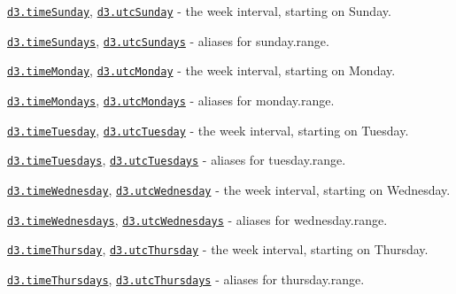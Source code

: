 \begin{DoxyItemize}
\item \href{https://github.com/d3/d3-time/blob/master/README.md#timeSunday}{\tt d3.\+time\+Sunday}, \href{https://github.com/d3/d3-time/blob/master/README.md#timeSunday}{\tt d3.\+utc\+Sunday} -\/ the week interval, starting on Sunday.
\item \href{https://github.com/d3/d3-time/blob/master/README.md#timeSunday}{\tt d3.\+time\+Sundays}, \href{https://github.com/d3/d3-time/blob/master/README.md#timeSunday}{\tt d3.\+utc\+Sundays} -\/ aliases for sunday.\+range.
\item \href{https://github.com/d3/d3-time/blob/master/README.md#timeMonday}{\tt d3.\+time\+Monday}, \href{https://github.com/d3/d3-time/blob/master/README.md#timeMonday}{\tt d3.\+utc\+Monday} -\/ the week interval, starting on Monday.
\item \href{https://github.com/d3/d3-time/blob/master/README.md#timeMonday}{\tt d3.\+time\+Mondays}, \href{https://github.com/d3/d3-time/blob/master/README.md#timeMonday}{\tt d3.\+utc\+Mondays} -\/ aliases for monday.\+range.
\item \href{https://github.com/d3/d3-time/blob/master/README.md#timeTuesday}{\tt d3.\+time\+Tuesday}, \href{https://github.com/d3/d3-time/blob/master/README.md#timeTuesday}{\tt d3.\+utc\+Tuesday} -\/ the week interval, starting on Tuesday.
\item \href{https://github.com/d3/d3-time/blob/master/README.md#timeTuesday}{\tt d3.\+time\+Tuesdays}, \href{https://github.com/d3/d3-time/blob/master/README.md#timeTuesday}{\tt d3.\+utc\+Tuesdays} -\/ aliases for tuesday.\+range.
\item \href{https://github.com/d3/d3-time/blob/master/README.md#timeWednesday}{\tt d3.\+time\+Wednesday}, \href{https://github.com/d3/d3-time/blob/master/README.md#timeWednesday}{\tt d3.\+utc\+Wednesday} -\/ the week interval, starting on Wednesday.
\item \href{https://github.com/d3/d3-time/blob/master/README.md#timeWednesday}{\tt d3.\+time\+Wednesdays}, \href{https://github.com/d3/d3-time/blob/master/README.md#timeWednesday}{\tt d3.\+utc\+Wednesdays} -\/ aliases for wednesday.\+range.
\item \href{https://github.com/d3/d3-time/blob/master/README.md#timeThursday}{\tt d3.\+time\+Thursday}, \href{https://github.com/d3/d3-time/blob/master/README.md#timeThursday}{\tt d3.\+utc\+Thursday} -\/ the week interval, starting on Thursday.
\item \href{https://github.com/d3/d3-time/blob/master/README.md#timeThursday}{\tt d3.\+time\+Thursdays}, \href{https://github.com/d3/d3-time/blob/master/README.md#timeThursday}{\tt d3.\+utc\+Thursdays} -\/ aliases for thursday.\+range.

\end{DoxyItemize}
